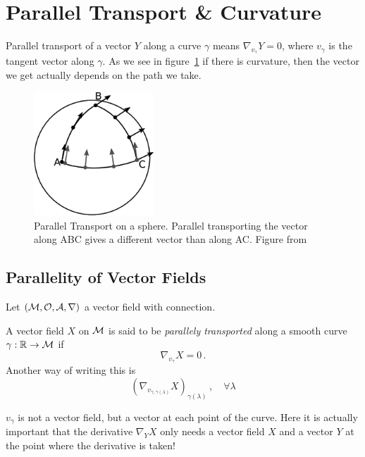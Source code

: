 \documentclass[11pt, a4paper, twocolumn]{article} %
\begin{document}
\section{Parallel Transport \& Curvature}
Parallel transport of a vector $Y$ along a curve $\gamma$ means $\nabla_{v_\gamma} Y = 0$,
where $v_\gamma$ is the tangent vector along $\gamma$.
As we see in figure~\ref{fig:parallelTransportSphere} if there is curvature,
then the vector we get actually depends on the path we take.
\begin{figure}[tbh]
    \centering
    \includegraphics[width = 0.4\textwidth]{figures/parallelTransportSphere.png}
    \caption{Parallel Transport on a sphere. Parallel transporting the vector along ABC gives
    a different vector than along AC. Figure from~\cite{parallelTransportFigure}}
    \label{fig:parallelTransportSphere}
\end{figure}

\subsection{Parallelity of Vector Fields}
Let $(\mathcal{M}, \mathcal{O}, \mathcal{A}, \nabla)$ a vector field with connection.
\begin{defn}
    A vector field $X$ on $\mathcal{M}$ is said to be \textit{parallely transported} along a smooth curve $\gamma: \mathbb{R}\to \mathcal{M}$
    if 
    \begin{equation}
        \boxed{
        \nabla_{v_\gamma} X = 0\,.
    }
    \end{equation}
    Another way of writing this is
    \begin{equation}
        \left(\nabla_{v_{\gamma, \gamma(\lambda)}}X\right)_{\gamma(\lambda)}\,,\quad\forall \lambda
    \end{equation}
\end{defn}
\begin{note}
    $v_\gamma$ is not a vector field, but a vector at each point of the curve.
    Here it is actually important that the derivative $\nabla_Y X$ only needs a
    vector field $X$ and a vector $Y$ at the point where the derivative is taken!
\end{note}
\end{document}
